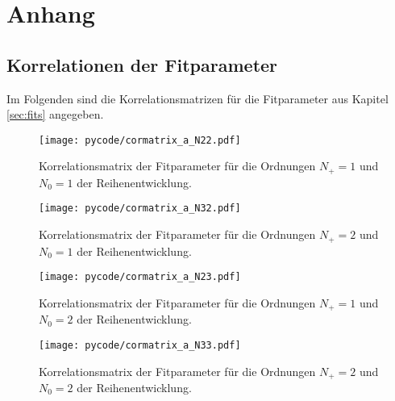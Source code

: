 \chapter{Anhang}

\section{Korrelationen der Fitparameter}
Im Folgenden sind die Korrelationsmatrizen für die Fitparameter aus Kapitel \ref{sec:fits} angegeben.
\begin{figure}
  \centering
  \texttt{[image: pycode/cormatrix\_a\_N22.pdf]}
  \caption{Korrelationsmatrix der Fitparameter für die Ordnungen $N_+ = \num{1}$ und $N_0 = \num{1}$ der Reihenentwicklung.}
  \label{fig:fitcor22}
\end{figure}

\begin{figure}
  \centering
  \texttt{[image: pycode/cormatrix\_a\_N32.pdf]}
  \caption{Korrelationsmatrix der Fitparameter für die Ordnungen $N_+ = \num{2}$ und $N_0 = \num{1}$ der Reihenentwicklung.}
  \label{fig:fitcor32}
\end{figure}

\begin{figure}
  \centering
  \texttt{[image: pycode/cormatrix\_a\_N23.pdf]}
  \caption{Korrelationsmatrix der Fitparameter für die Ordnungen $N_+ = \num{1}$ und $N_0 = \num{2}$ der Reihenentwicklung.}
  \label{fig:fitcor23}
\end{figure}

\begin{figure}
  \centering
  \texttt{[image: pycode/cormatrix\_a\_N33.pdf]}
  \caption{Korrelationsmatrix der Fitparameter für die Ordnungen $N_+ = \num{2}$ und $N_0 = \num{2}$ der Reihenentwicklung.}
  \label{fig:fitcor33}
\end{figure}

